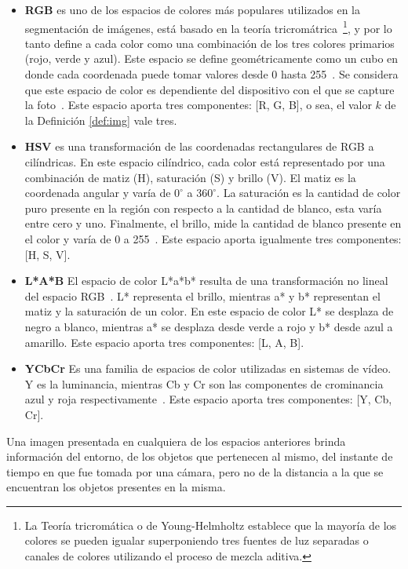 \begin{itemize}
	\item \textbf{RGB} es uno de los espacios de colores más populares utilizados en la segmentación de imágenes, está basado en la teoría tricromátrica~\footnote{La Teoría tricromática o de Young-Helmholtz establece que la mayoría de los colores se pueden igualar superponiendo tres fuentes de luz separadas o canales de colores utilizando el proceso de mezcla aditiva.}, y por lo tanto define a cada color como una combinación de los tres colores primarios (rojo, verde y azul). Este espacio se define geométricamente como un cubo en donde cada coordenada puede tomar valores desde 0 hasta 255~\cite{sangwine1998colour}. Se considera que este espacio de color es dependiente del dispositivo con el que se capture	la foto~\cite{tkalcic2003colour, ruela2013role}. Este espacio aporta tres componentes: [R, G, B], o sea, el valor $k$ de la Definición \ref{def:img} vale tres.
	\item \textbf{HSV} es una transformación de las coordenadas rectangulares de RGB a cilíndricas. En este espacio cilíndrico, cada color está representado por una combinación de matiz (H), saturación (S) y brillo (V). El matiz es la coordenada angular y varía de $0^{\circ}$ a $360^{\circ}$. La saturación es la cantidad de color puro presente en la región con respecto a la cantidad de blanco, esta varía entre cero y uno. Finalmente, el brillo, mide la cantidad de blanco presente en el color y varía de 0 a 255~\cite{ruela2013role}. Este espacio aporta igualmente tres componentes: [H, S, V].
	\item \textbf{L*A*B} El espacio de color L*a*b* resulta de una transformación no lineal del espacio RGB~\cite{bradski2000opencv}. L* representa el brillo, mientras a* y b* representan el matiz y la saturación de un color. En este espacio de color L* se desplaza de negro a blanco, mientras a* se desplaza desde verde a rojo y b* desde azul a amarillo. Este espacio aporta tres componentes: [L, A, B].
	\item \textbf{YCbCr} Es una familia de espacios de color utilizadas en sistemas de vídeo. Y es la luminancia, mientras Cb y Cr son las componentes de crominancia azul y roja respectivamente~\cite{sergyan2007color}. Este espacio aporta tres componentes: [Y, Cb, Cr].
\end{itemize}

Una imagen presentada en cualquiera de los espacios anteriores brinda información del entorno, de los objetos que pertenecen al mismo, del instante de tiempo en que fue tomada por una cámara, pero no de la distancia a la que se encuentran los objetos presentes en la misma. 

